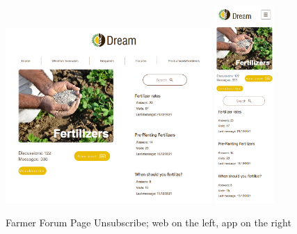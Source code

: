 \documentclass{article}
\begin{document}
        \begin{figure} [h]
            \centering
            \includegraphics[width=0.7\textwidth]{images/UserInterfaces/Farmer/Forum/ForumPageUnsubWeb.png}
            \quad
            \includegraphics[width=0.2\textwidth]{images/UserInterfaces/Farmer/Forum/ForumPageUnsubApp.png}
            \quad
            \caption{\label{fig:farmerForumPageUnsub}Farmer Forum Page Unsubscribe; web on the left, app on the right}
        \end{figure}
        \newpage
\end{document}
